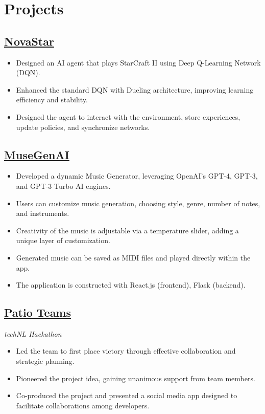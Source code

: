 \documentclass[12pt]{extarticle}
\begin{document}
\section*{Projects}

\subsection*{\href{https://github.com/Inefy/NovaStar}{NovaStar}
} \hfill
\begin{itemize}
\item Designed an AI agent that plays StarCraft II using Deep Q-Learning Network (DQN).
\item Enhanced the standard DQN with Dueling architecture, improving learning efficiency and stability.
\item Designed the agent to interact with the environment, store experiences, update policies, and synchronize networks.

\end{itemize}

\subsection*{\href{https://github.com/Inefy/MuseGenAI}{MuseGenAI}
} \hfill
\begin{itemize}
	\item Developed a dynamic Music Generator, leveraging OpenAI's GPT-4, GPT-3, and GPT-3 Turbo AI engines.
	\item Users can customize music generation, choosing style, genre, number of notes, and instruments.
	\item Creativity of the music is adjustable via a temperature slider, adding a unique layer of customization.
	\item Generated music can be saved as MIDI files and played directly within the app.
	\item The application is constructed with React.js (frontend), Flask (backend).
\end{itemize}
	



\subsection*{\href{https://technl.ca/2022/07/28/techfwd-conclusion/}{Patio Teams}
} \hfill

\textsl{techNL Hackathon}
\begin{itemize}
	\item Led the team to first place victory through effective collaboration and strategic planning.
  \item Pioneered the project idea, gaining unanimous support from team members.
  \item Co-produced the project and presented a social media app designed to facilitate collaborations among developers.
\end{itemize}
\end{document}
